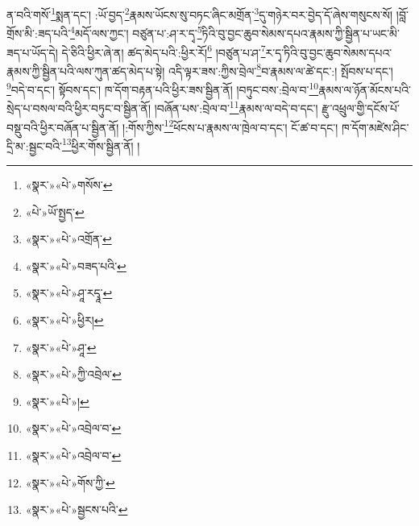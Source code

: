 ན་བའི་གསོ་\footnote{«སྣར་»«པེ་»གསོས་}སྨན་དང་། :ཡོ་བྱད་\footnote{«པེ་»ཡོ་སྤྱད་}རྣམས་ཡོངས་སུ་བཏང་ཞིང་མགྲོན་\footnote{«སྣར་»«པེ་»འགྲོན་}དུ་གཉེར་བར་བྱེད་དོ་ཞེས་གསུངས་སོ། །བློ་གྲོས་མི་:ཟད་པའི་\footnote{«སྣར་»«པེ་»བཟད་པའི་}མདོ་ལས་ཀྱང་། བཙུན་པ་:ཤ་ར་དྭ་\footnote{«སྣར་»«པེ་»ཤཱ་རདྭཱ་}ཏིའི་བུ་བྱང་ཆུབ་སེམས་དཔའ་རྣམས་ཀྱི་སྦྱིན་པ་ཡང་མི་ཟད་པ་ཡོད་དེ། དེ་ཅིའི་ཕྱིར་ཞེ་ན། ཚད་མེད་པའི་:ཕྱིར་རོ།\footnote{«སྣར་»«པེ་»ཕྱིར།} །བཙུན་པ་ཤ་\footnote{«སྣར་»«པེ་»ཤཱ་}ར་དྭ་ཏིའི་བུ་བྱང་ཆུབ་སེམས་དཔའ་རྣམས་ཀྱི་སྦྱིན་པའི་ལས་ཀུན་ཚད་མེད་པ་སྟེ། འདི་ལྟར་ཟས་:ཀྱིས་བྲེལ་\footnote{«སྣར་»«པེ་»ཀྱི་འབྲེལ་}བ་རྣམས་ལ་ཚེ་དང་:། སྤོབས་པ་དང་། \footnote{«སྣར་»«པེ་»།  }བདེ་བ་དང་། སྟོབས་དང་། ཁ་དོག་བརྟན་པའི་ཕྱིར་ཟས་སྦྱིན་ནོ། །བཏུང་བས་:བྲེལ་བ་\footnote{«སྣར་»«པེ་»འབྲེལ་བ་}རྣམས་ལ་ཉོན་མོངས་པའི་སྲེད་པ་བསལ་བའི་ཕྱིར་བཏུང་བ་སྦྱིན་ནོ། །བཞོན་པས་:བྲེལ་བ་\footnote{«སྣར་»«པེ་»འབྲེལ་བ་}རྣམས་ལ་བདེ་བ་དང་། རྫུ་འཕྲུལ་གྱི་དངོས་པོ་བསྡུ་བའི་ཕྱིར་བཞོན་པ་སྦྱིན་ནོ། །:གོས་ཀྱིས་\footnote{«སྣར་»«པེ་»གོས་ཀྱི་}ཕོངས་པ་རྣམས་ལ་ཁྲེལ་བ་དང་། ངོ་ཚ་བ་དང་། ཁ་དོག་མཛེས་ཤིང་དྲི་མ་:སྦྱང་བའི་\footnote{«སྣར་»«པེ་»སྦྱངས་པའི་}ཕྱིར་གོས་སྦྱིན་ནོ། །

